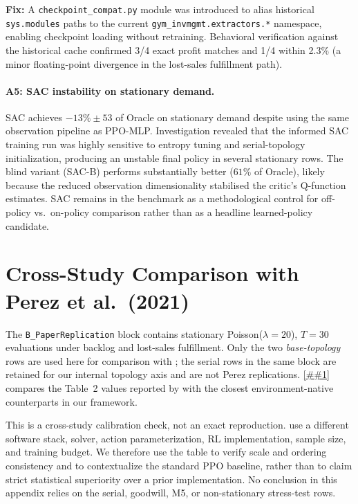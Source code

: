 \documentclass[10pt,a4paper]{article}
\providecommand{\Cref}[1]{\ref{##1}}
\begin{document}
\textbf{Fix:} A \texttt{checkpoint\_compat.py} module was introduced to alias
historical \texttt{sys.modules} paths to the current
\texttt{gym\_invmgmt.extractors.*} namespace, enabling checkpoint
loading without retraining. Behavioral verification against the
historical cache confirmed 3/4 exact profit matches and 1/4 within
2.3\% (a minor floating-point divergence in the lost-sales
fulfillment path).

\paragraph{A5: SAC instability on stationary demand.}
SAC achieves $-13\% \pm 53$ of Oracle on stationary demand despite
using the same observation pipeline as PPO-MLP. Investigation revealed
that the informed SAC training run was highly sensitive to entropy
tuning and serial-topology initialization, producing an unstable final
policy in several stationary rows. The blind variant (SAC-B) performs
substantially better ($61\%$ of Oracle), likely because the reduced
observation dimensionality stabilised the critic's Q-function estimates.
SAC remains in the benchmark as a methodological control for off-policy
vs.\ on-policy comparison rather than as a headline learned-policy
candidate.

\section{Cross-Study Comparison with Perez et al.\ (2021)}%
\label{sec:perez_comparison}

The \texttt{B\_PaperReplication} block contains stationary
Poisson($\lambda{=}20$), $T{=}30$ evaluations under backlog and
lost-sales fulfillment.  Only the two \emph{base-topology} rows are
used here for comparison with \citet{perez2021}; the serial
rows in the same block are retained for our internal topology axis and
are not Perez replications.  \Cref{tab:perez_comparison} compares the
Table~2 values reported by \citet{perez2021} with the closest
environment-native counterparts in our framework.

This is a cross-study calibration check, not an exact reproduction.
\citet{perez2021} use a different software stack, solver, action
parameterization, RL implementation, sample size, and training budget.
We therefore use the table to verify scale and ordering consistency
and to contextualize the standard PPO baseline, rather than to claim
strict statistical superiority over a prior implementation.  No
conclusion in this appendix relies on the serial, goodwill, M5, or
non-stationary stress-test rows.
\end{document}
